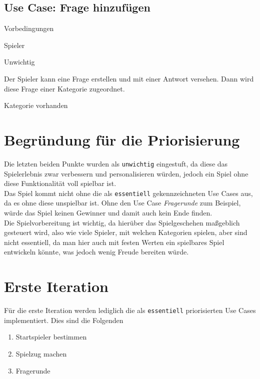 \subsection{Use Case: Frage hinzufügen}
\begin{labeling}[:]{Vorbedingungen}
\item [Akteure] Spieler
\item [Priorität] Unwichtig
\item [Beschreibung] Der Spieler kann eine Frage erstellen und mit einer Antwort versehen. Dann wird diese Frage einer Kategorie zugeordnet.
\item [Vorbedingungen] Kategorie vorhanden
\item [Offene Punkte]
\end{labeling}

\section{Begründung für die Priorisierung}\label{sec:begruendung-prio}
Die letzten beiden Punkte wurden als \texttt{unwichtig} eingestuft, da diese das Spielerlebnis zwar verbessern und personalisieren würden, jedoch ein Spiel ohne diese Funktionalität voll spielbar ist.\\
Das Spiel kommt nicht ohne die als \texttt{essentiell} gekennzeichneten Use Cases aus, da es ohne diese unspielbar ist. Ohne den Use Case \emph{Fragerunde} zum Beispiel, würde das Spiel keinen Gewinner und damit auch kein Ende finden.\\
Die Spielvorbereitung ist wichtig, da hierüber das Spielgeschehen maßgeblich gesteuert wird, also wie viele Spieler, mit welchen Kategorien spielen, aber sind nicht essentiell, da man hier auch mit festen Werten ein spielbares Spiel entwickeln könnte, was jedoch wenig Freude bereiten würde.

\section{Erste Iteration}
Für die erste Iteration werden lediglich die als \texttt{essentiell} priorisierten Use Cases implementiert. Dies sind die Folgenden

\begin{enumerate}
\item Startspieler bestimmen
\item Spielzug machen
\item Fragerunde
\end{enumerate}

